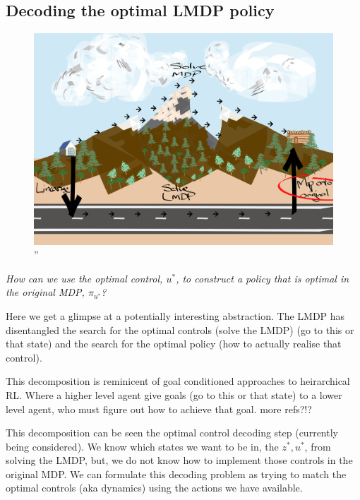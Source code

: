 
\subsection{Decoding the optimal LMDP policy}

\begin{figure}
\centering
\includegraphics[width=1\textwidth,height=0.5\textheight]{../../pictures/drawings/abstract-representations-project.png}
\caption{''}
\end{figure}

\begin{displayquote}
\textit{How can we use the optimal control, $u^{* }$, to construct a policy that is optimal in the original MDP, $\pi_{u^* }$?}
\end{displayquote}

Here we get a glimpse at a potentially interesting abstraction.
The LMDP has disentangled the search for the optimal controls (solve the LMDP) (go to this or
that state) and the search for the optimal policy (how to actually
realise that control).

This decomposition is reminicent of goal conditioned approaches to heirarchical RL.
Where a higher level agent give goals (go to this or that state) to a lower level
agent, who must figure out how to achieve that goal. \cite{Vezhnevets2017} {\color{red}more refs?!?}

This decomposition can be seen the optimal control decoding step (currently being considered). We know which
states we want to be in, the $z^{* }, u^{* }$, from solving the LMDP, but,
we do not know how to implement those controls in the original MDP.
We can formulate this decoding problem as trying to match the optimal controls (aka dynamics)
using the actions we have available.

